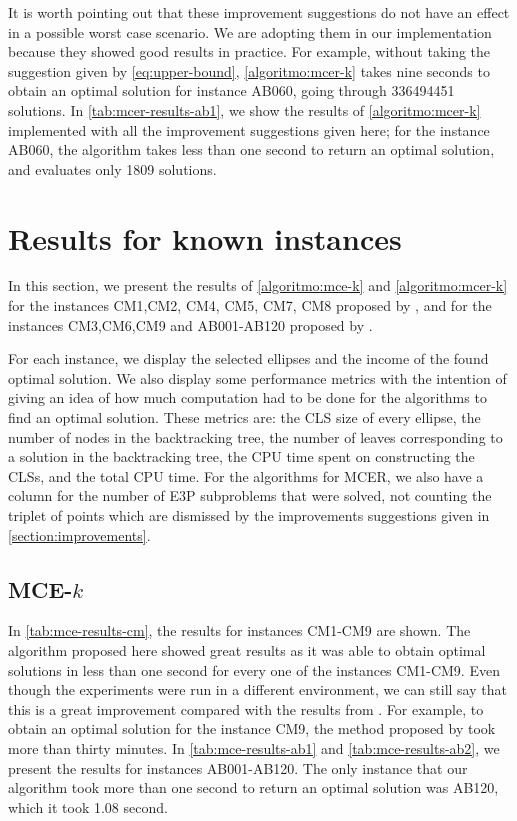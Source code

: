 It is worth pointing out that these improvement suggestions do not have an effect in a possible worst case scenario. We are adopting them in our implementation because they showed good results in practice.
For example, without taking the suggestion given by \autoref{eq:upper-bound}, \autoref{algoritmo:mcer-k} takes nine seconds to obtain an optimal solution for instance AB060, going through \num{336494451} solutions.
In \autoref{tab:mcer-results-ab1}, we show the results of \autoref{algoritmo:mcer-k} implemented with all the improvement suggestions given here; for the instance AB060, the algorithm takes less than one second to return an optimal solution, and evaluates only \num{1809} solutions.

\section{Results for known instances}

In this section, we present the results of \autoref{algoritmo:mce-k} and \autoref{algoritmo:mcer-k} for the instances CM1,CM2, CM4, CM5, CM7, CM8 proposed by , and for the instances CM3,CM6,CM9 and AB001-AB120 proposed by .

For each instance, we display the selected ellipses and the income of the found optimal solution. 
We also display some performance metrics with the intention of giving an idea of how much computation had to be done for the algorithms to find an optimal solution. These metrics are: 
the CLS size of every ellipse, the number of nodes in the backtracking tree, the number of leaves corresponding to a solution in the backtracking tree, the CPU time spent on constructing the CLSs, and the total CPU time.
For the algorithms for MCER, we also have a column for the number of E3P subproblems that were solved, not counting the triplet of points which are dismissed by the improvements suggestions given in \autoref{section:improvements}.


\subsection{MCE-$k$}

In \autoref{tab:mce-results-cm}, the results for instances CM1-CM9 are shown. 
The algorithm proposed here showed great results as it was able to obtain optimal solutions in less than one second for every one of the instances CM1-CM9.
Even though the experiments were run in a different environment, we can still say that this is a great improvement compared with the results from . For example, to obtain an optimal solution for the instance CM9, the method proposed by  took more than thirty minutes.
In \autoref{tab:mce-results-ab1} and \autoref{tab:mce-results-ab2}, we present the results for instances AB001-AB120. The only instance that our algorithm took more than one second to return an optimal solution was AB120, which it took 1.08 second.

